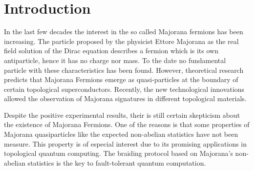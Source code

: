 \documentclass[showpacs,aps,prb,reprint,superscriptaddress]{revtex4-1}
\begin{document}
\maketitle


\section{Introduction}
\label{sec:Intro}



In the last few decades the interest in the so called Majorana fermions has been increasing. The particle proposed by the physicist Ettore Majorana  as the real field solution of the Dirac equation describes a fermion which is its own antiparticle, hence it has no charge nor mass. To the date no fundamental particle with these characteristics has been found. However,  theoretical research predicts that Majorana Fermions emerge as quasi-particles at the boundary of certain topological superconductors. \citet{kitaev_unpaired_2001} Recently, the new technological innovations  allowed the observation of Majorana signatures in different topological materials. \citep{mourik_signatures_2012,das_zero-bias_2012,deng_anomalous_2012,zhang_quantized_2018}

Despite the positive experimental results, their is still certain skepticism about the existence of  Majorana Fermions. One of the reasons  is that some properties of Majorana quasiparticles like the expected non-abelian statistics have not been measure. This property is of especial interest due to its promising applications in topological quantum computing. The braiding protocol based on  Majorana's non-abelian statistics is the key to  fault-tolerant quantum computation. \cite{kitaev_fault-tolerant_2003,sarma_majorana_2015} 

\end{document}
